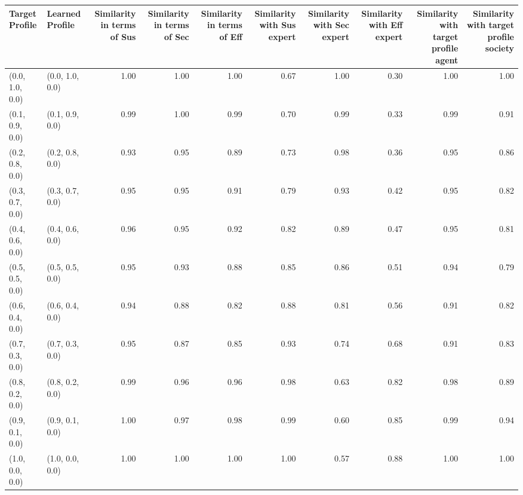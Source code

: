 \begin{tabular}{llrrrrrrrr}
\toprule
Target Profile & Learned Profile & Similarity in terms of Sus & Similarity in terms of Sec & Similarity in terms of Eff & Similarity with Sus expert & Similarity with Sec expert & Similarity with Eff expert & Similarity with target profile agent & Similarity with target profile society \\
\midrule
(0.0, 1.0, 0.0) & (0.0, 1.0, 0.0) & 1.00 & 1.00 & 1.00 & 0.67 & 1.00 & 0.30 & 1.00 & 1.00 \\
(0.1, 0.9, 0.0) & (0.1, 0.9, 0.0) & 0.99 & 1.00 & 0.99 & 0.70 & 0.99 & 0.33 & 0.99 & 0.91 \\
(0.2, 0.8, 0.0) & (0.2, 0.8, 0.0) & 0.93 & 0.95 & 0.89 & 0.73 & 0.98 & 0.36 & 0.95 & 0.86 \\
(0.3, 0.7, 0.0) & (0.3, 0.7, 0.0) & 0.95 & 0.95 & 0.91 & 0.79 & 0.93 & 0.42 & 0.95 & 0.82 \\
(0.4, 0.6, 0.0) & (0.4, 0.6, 0.0) & 0.96 & 0.95 & 0.92 & 0.82 & 0.89 & 0.47 & 0.95 & 0.81 \\
(0.5, 0.5, 0.0) & (0.5, 0.5, 0.0) & 0.95 & 0.93 & 0.88 & 0.85 & 0.86 & 0.51 & 0.94 & 0.79 \\
(0.6, 0.4, 0.0) & (0.6, 0.4, 0.0) & 0.94 & 0.88 & 0.82 & 0.88 & 0.81 & 0.56 & 0.91 & 0.82 \\
(0.7, 0.3, 0.0) & (0.7, 0.3, 0.0) & 0.95 & 0.87 & 0.85 & 0.93 & 0.74 & 0.68 & 0.91 & 0.83 \\
(0.8, 0.2, 0.0) & (0.8, 0.2, 0.0) & 0.99 & 0.96 & 0.96 & 0.98 & 0.63 & 0.82 & 0.98 & 0.89 \\
(0.9, 0.1, 0.0) & (0.9, 0.1, 0.0) & 1.00 & 0.97 & 0.98 & 0.99 & 0.60 & 0.85 & 0.99 & 0.94 \\
(1.0, 0.0, 0.0) & (1.0, 0.0, 0.0) & 1.00 & 1.00 & 1.00 & 1.00 & 0.57 & 0.88 & 1.00 & 1.00 \\
\bottomrule
\end{tabular}
